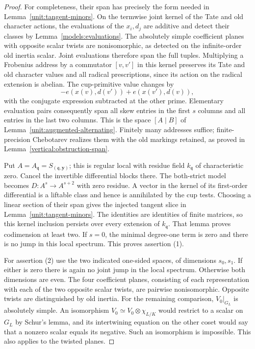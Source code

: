\begin{proof}
For completeness, their span has precisely the form needed in
Lemma~\ref{unit:tangent-minors}.  On the termwise joint kernel of
the Tate and old character actions, the evaluations of the
$x_i,d_j$ are additive and detect their classes by
Lemma~\ref{models:evaluations}.  The absolutely simple coefficient
planes with opposite scalar twists are nonisomorphic, as detected
on the infinite-order old inertia scalar.  Joint evaluations
therefore span the full tuples.  Multiplying a Frobenius address
by a commutator $[v,v']$ in this kernel preserves its Tate and old
character values and all radical prescriptions, since its action
on the radical extension is abelian.  The cup-primitive value
changes by
\[
       -e(x(v),d(v'))+e(x(v'),d(v)),
\]
with the conjugate expression subtracted at the other prime.
Elementary evaluation pairs consequently span all skew entries
in the first $s$ columns and all entries in the last two columns.
This is the space $[A\mid B]$ of
Lemma~\ref{unit:augmented-alternating}.  Finitely many addresses
suffice; finite-precision Chebotarev realizes them with the old
markings retained, as proved in
Lemma~\ref{vertical:obstruction-span}.

Put $A=A_{\mathfrak q}=S_{(\mathfrak q,\mathbf y)}$; this is
regular local with residue field $k_{\mathfrak q}$ of
characteristic zero.  Cancel the invertible differential blocks
there.  The both-strict model becomes
$D:A^s\to A^{s+2}$ with zero residue.  A vector in the kernel of
its first-order differential is a liftable class and hence is
annihilated by the cup tests.  Choosing a linear section of their
span gives the injected tangent slice in
Lemma~\ref{unit:tangent-minors}.  The identities are identities of
finite matrices, so this kernel inclusion persists over every
extension of $k_{\mathfrak q}$.  That lemma proves codimension at
least two.  If $s=0$, the minimal degree-one term is zero and
there is no jump in this local spectrum.  This proves assertion
(1).

For assertion (2) use the two indicated one-sided spaces, of
dimensions $s_0,s_1$.  If either is zero there is again no joint
jump in the local spectrum.  Otherwise both dimensions are even.
The four coefficient planes, consisting of each representation
with each of the two opposite scalar twists, are pairwise
nonisomorphic.  Opposite twists are distinguished by old inertia.
For the remaining comparison, $V_0|_{G_L}$ is absolutely simple.
An isomorphism $V_0\simeq V_0\otimes\chi_{L/K}$ would restrict to
a scalar on $G_L$ by Schur's lemma, and its intertwining equation
on the other coset would say that a nonzero scalar equals its
negative.  Such an isomorphism is impossible.  This also applies
to the twisted planes.


\end{proof}
